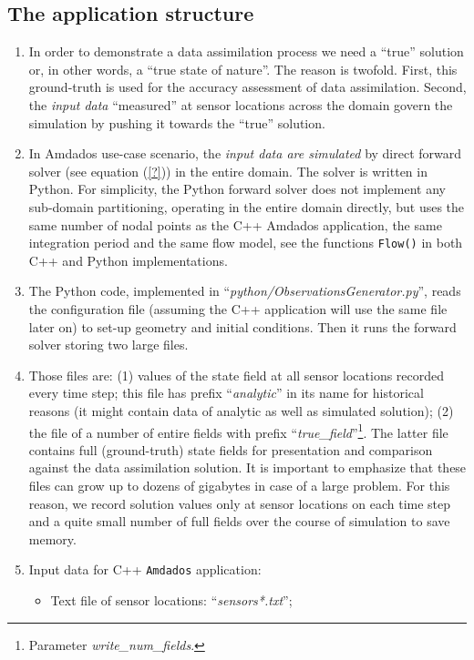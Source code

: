 \documentclass[]{article}
\begin{document}
\subsection{The application structure}
\begin{enumerate}
\item In order to demonstrate a data assimilation process we need a ``true'' solution or, in other words, a ``true state of nature''. The reason is twofold. First, this ground-truth is used for the accuracy assessment of data assimilation. Second, the \textit{input data} ``measured'' at sensor locations across the domain govern the simulation by pushing it towards the ``true'' solution.
\item In Amdados use-case scenario, the \textit{input data are simulated} by direct forward solver (see equation (\ref{?})) in the entire domain. The solver is written in Python. For simplicity, the Python forward solver does not implement any sub-domain partitioning, operating in the entire domain directly, but uses the same number of nodal points as the C++ Amdados application, the same integration period and the same flow model, see the functions \texttt{Flow()} in both C++ and Python implementations.
\item The Python code, implemented in ``\textit{python/ObservationsGenerator.py}'', reads the configuration file (assuming the C++ application will use the same file later on) to set-up geometry and initial conditions. Then it runs the forward solver storing two large files.
\item Those files are: (1) values of the state field at all sensor locations recorded every time step; this file has prefix ``\textit{analytic}'' in its name for historical reasons (it might contain data of analytic as well as simulated solution); (2) the file of a number of entire fields with prefix ``\textit{true\_field}''\footnote{Parameter \textit{write\_num\_fields}.}. The latter file contains full (ground-truth) state fields for presentation and comparison against the data assimilation solution. It is important to emphasize that these files can grow up to dozens of gigabytes in case of a large problem. For this reason, we record solution values only at sensor locations on each time step and a quite small number of full fields over the course of simulation to save memory.
\item Input data for C++ \texttt{Amdados} application:
    \begin{itemize}
    \item Text file of sensor locations: ``\textit{sensors*.txt}'';

\end{itemize}
\end{enumerate}
\end{document}
